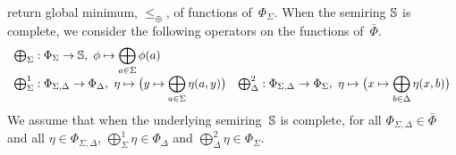 return global minimum, \wrt $\leq_\oplus$, of functions of~$\Phi_\Sigma$.
%
When the semiring $\mathbb{S}$ is complete, we
consider the following operators on the functions of~$\bar\Phi$. %
\[
\begin{array}{ll}
\bigoplus_\Sigma : \Phi_\Sigma \to \mathbb{S},\
  \phi \mapsto \displaystyle\bigoplus_{a \in \Sigma} \phi(a)\\
\bigoplus^1_\Sigma :
  \Phi_{\Sigma,\Delta} \to \Phi_\Delta,\
  \eta \mapsto \bigl( y \mapsto \displaystyle\bigoplus_{a \in \Sigma} \eta(a, y) \bigr) &
\bigoplus^2_\Delta :
  \Phi_{\Sigma,\Delta} \to \Phi_\Sigma,\
  \eta \mapsto \bigl( x \mapsto \displaystyle\bigoplus_{b \in \Delta} \eta(x, b) \bigr)\\
\end{array}
\]
%
%
We assume that when the underlying semiring~$\mathbb{S}$ is complete,
for all $\Phi_{\Sigma, \Delta} \in \bar\Phi$
and all $\eta \in \Phi_{\Sigma, \Delta}$,
$\bigoplus^1_\Sigma \eta \in \Phi_{\Delta}$ and
$\bigoplus^2_\Delta \eta \in \Phi_{\Sigma}$.

